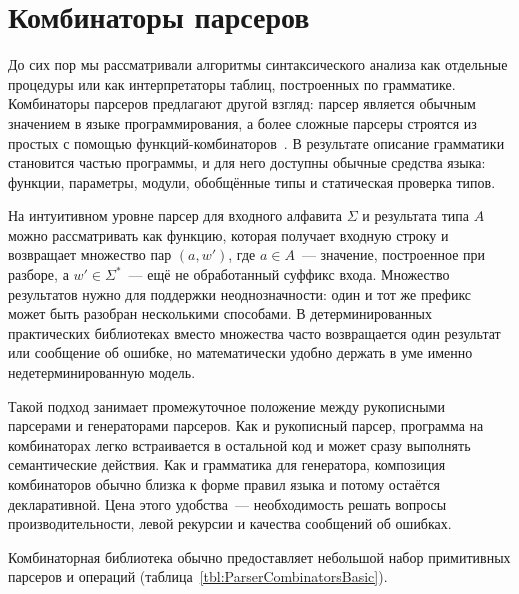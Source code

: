 \section{Комбинаторы парсеров}
\label{sec:Combinators}

До сих пор мы рассматривали алгоритмы синтаксического анализа как отдельные процедуры или как интерпретаторы таблиц, построенных по грамматике. Комбинаторы парсеров предлагают другой взгляд: парсер является обычным значением в языке программирования, а более сложные парсеры строятся из простых с помощью функций-комбинаторов~. В результате описание грамматики становится частью программы, и для него доступны обычные средства языка: функции, параметры, модули, обобщённые типы и статическая проверка типов.

На интуитивном уровне парсер для входного алфавита $\Sigma$ и результата типа $A$ можно рассматривать как функцию, которая получает входную строку и возвращает множество пар $(a,w')$, где $a \in A$~--- значение, построенное при разборе, а $w' \in \Sigma^*$~--- ещё не обработанный суффикс входа. Множество результатов нужно для поддержки неоднозначности: один и тот же префикс может быть разобран несколькими способами. В детерминированных практических библиотеках вместо множества часто возвращается один результат или сообщение об ошибке, но математически удобно держать в уме именно недетерминированную модель.

Такой подход занимает промежуточное положение между рукописными парсерами и генераторами парсеров. Как и рукописный парсер, программа на комбинаторах легко встраивается в остальной код и может сразу выполнять семантические действия. Как и грамматика для генератора, композиция комбинаторов обычно близка к форме правил языка и потому остаётся декларативной. Цена этого удобства~--- необходимость решать вопросы производительности, левой рекурсии и качества сообщений об ошибках.

Комбинаторная библиотека обычно предоставляет небольшой набор примитивных парсеров и операций (таблица~\ref{tbl:ParserCombinatorsBasic}).

